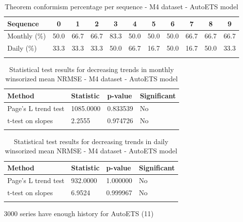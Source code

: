 \begin{table}[h]
\caption{Theorem conformism percentage per sequence - M4 dataset - AutoETS model}\label{tab:conformism_M4_AutoETS}
\begin{tabular*}{\textwidth}{@{\extracolsep\fill}lcccccccccc}
\toprule
Sequence & 0 & 1 & 2 & 3 & 4 & 5 & 6 & 7 & 8 & 9 \\
\midrule
Monthly (\%) & 50.0 & 66.7 & 66.7 & 83.3 & 50.0 & 50.0 & 50.0 & 66.7 & 66.7 & 66.7 \\
Daily (\%) & 33.3 & 33.3 & 33.3 & 50.0 & 66.7 & 16.7 & 50.0 & 16.7 & 50.0 & 33.3 \\
\botrule
\end{tabular*}
\end{table}


\begin{table}[h]
\caption{Statistical test results for decreasing trends in monthly winsorized mean NRMSE - M4 dataset - AutoETS model}\label{tab:monthly_test_M4_AutoETS}
\begin{tabular}{@{}llll@{}}
\toprule
Method & Statistic & p-value & Significant \\
\midrule
Page's L trend test & 1085.0000 & 0.833539 & No \\
t-test on slopes & 2.2555 & 0.974726 & No \\
\botrule
\end{tabular}
\end{table}


\begin{table}[h]
\caption{Statistical test results for decreasing trends in daily winsorized mean NRMSE - M4 dataset - AutoETS model}\label{tab:monthly_test_M4_AutoETS}
\begin{tabular}{@{}llll@{}}
\toprule
Method & Statistic & p-value & Significant \\
\midrule
Page's L trend test & 932.0000 & 1.000000 & No \\
t-test on slopes & 6.9524 & 0.999967 & No \\
\botrule
\end{tabular}
\end{table}


3000 series have enough history for AutoETS (11)